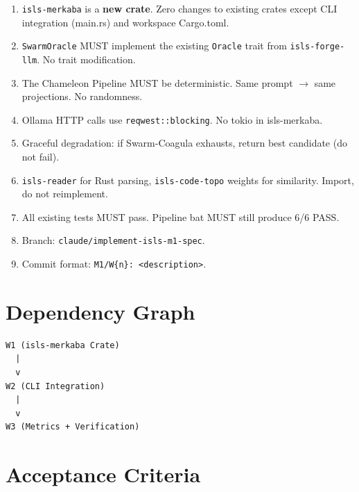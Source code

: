 \documentclass[11pt,a4paper]{article}
\begin{document}
\begin{enumerate}
\item \texttt{isls-merkaba} is a \textbf{new crate}. Zero changes 
      to existing crates except CLI integration (main.rs) and 
      workspace Cargo.toml.
\item \texttt{SwarmOracle} MUST implement the existing 
      \texttt{Oracle} trait from \texttt{isls-forge-llm}. No 
      trait modification.
\item The Chameleon Pipeline MUST be deterministic. Same prompt 
      $\to$ same projections. No randomness.
\item Ollama HTTP calls use \texttt{reqwest::blocking}. No tokio 
      in isls-merkaba.
\item Graceful degradation: if Swarm-Coagula exhausts, return 
      best candidate (do not fail).
\item \texttt{isls-reader} for Rust parsing, \texttt{isls-code-topo}
      weights for similarity. Import, do not reimplement.
\item All existing tests MUST pass. Pipeline bat MUST still 
      produce 6/6 PASS.
\item Branch: \texttt{claude/implement-isls-m1-spec}.
\item Commit format: \texttt{M1/W\{n\}: <description>}.
\end{enumerate}


\section{Dependency Graph}

\begin{verbatim}
W1 (isls-merkaba Crate)
  |
  v
W2 (CLI Integration)
  |
  v
W3 (Metrics + Verification)
\end{verbatim}


\section{Acceptance Criteria}
\end{document}
